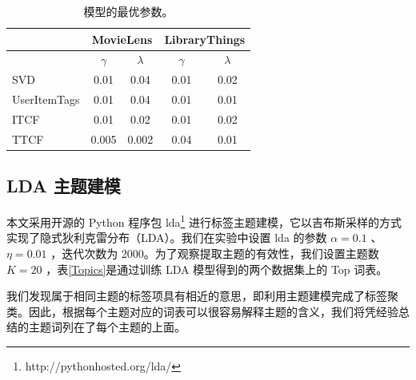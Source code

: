 \begin{table}[htbp]
\centering
\caption{模型的最优参数。}
\label{params}
\begin{tabular}{|l|c|c|c|c|}
\hline
             & \multicolumn{2}{c|}{MovieLens} & \multicolumn{2}{c|}{LibraryThings} \\ \hline
             & $\gamma$      & $\lambda$      & $\gamma$        & $\lambda$        \\ \hline
SVD          & 0.01          & 0.04           & 0.01            & 0.02             \\ \hline
UserItemTags & 0.01          & 0.04           & 0.01            & 0.01             \\ \hline
ITCF         & 0.01          & 0.02           & 0.01            & 0.02             \\ \hline
TTCF         & 0.005         & 0.002          & 0.04            & 0.01             \\ \hline
\end{tabular}
\end{table}

\subsection{LDA 主题建模}
本文采用开源的 Python 程序包 lda\footnote{http://pythonhosted.org/lda/} 进行标签主题建模，它以吉布斯采样的方式实现了隐式狄利克雷分布（LDA）。我们在实验中设置 lda 的参数 $\alpha=0.1​$ 、$\eta = 0.01​$ ，迭代次数为 2000。为了观察提取主题的有效性，我们设置主题数 $K=20$ ，表\ref{Topics}是通过训练 LDA 模型得到的两个数据集上的 Top 词表。

我们发现属于相同主题的标签项具有相近的意思，即利用主题建模完成了标签聚类。因此，根据每个主题对应的词表可以很容易解释主题的含义，我们将凭经验总结的主题词列在了每个主题的上面。

